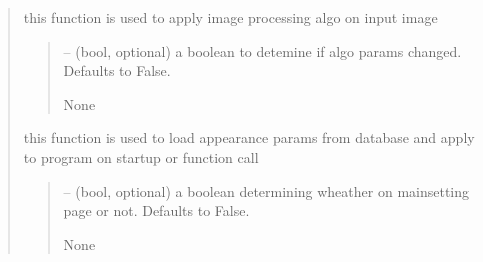 \documentclass[letterpaper,10pt,english]{sphinxmanual}
\begin{document}
\begin{quote}
\begin{savenotes}
\begin{fulllineitems}
\begin{savenotes}\begin{fulllineitems}
\label{\detokenize{setting/setting_api:oxin.setting_api.API.image_processing_calibration}}
\pysigstartsignatures
{}
\pysigstopsignatures
\sphinxAtStartPar
this function is used to apply image processing algo on input image
\begin{quote}\begin{description}
\sphinxAtStartPar
{} – (bool, optional) a boolean to detemine if algo params changed. Defaults to False.

\sphinxAtStartPar
None

\end{description}\end{quote}

\end{fulllineitems}\end{savenotes}


\begin{savenotes}\begin{fulllineitems}
\label{\detokenize{setting/setting_api:oxin.setting_api.API.load_appearance_params_on_start}}
\pysigstartsignatures
{}
\pysigstopsignatures
\sphinxAtStartPar
this function is used to load appearance params from database and apply to program on start\sphinxhyphen{}up or function call
\begin{quote}\begin{description}
\sphinxAtStartPar
{} – (bool, optional) a boolean determining wheather on mainsetting page or not. Defaults to False.

\sphinxAtStartPar
None

\end{description}\end{quote}


\end{fulllineitems}
\end{savenotes}
\end{fulllineitems}
\end{savenotes}
\end{quote}
\end{document}
